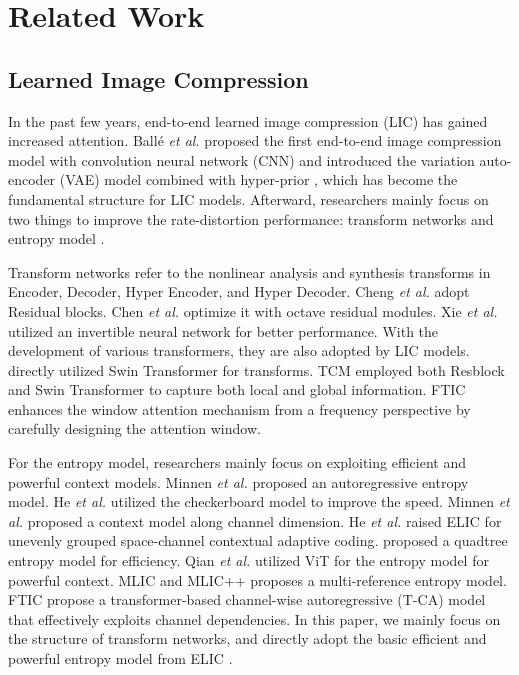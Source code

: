 \section{Related Work}
\label{sec:Related work}
\subsection{Learned Image Compression}





In the past few years, end-to-end learned image compression (LIC) has gained increased attention. Ball\'{e} \textit{et al.} \cite{balle2016end} proposed the first end-to-end image compression model with convolution neural network (CNN) and introduced the variation auto-encoder (VAE) model combined with hyper-prior \cite{balle2018variational}, which has become the fundamental structure for LIC models. Afterward, researchers mainly focus on two things to improve the rate-distortion performance: transform networks and entropy model \cite{zafari2023frequency, mentzer2022vct, ma2019iwave, lu2022transformer, liu2020unified, gao2021neural, fu2023asymmetric, begaint2020compressai, han2024causal}.

Transform networks refer to the nonlinear analysis and synthesis transforms in Encoder, Decoder, Hyper Encoder, and Hyper Decoder. Cheng \textit{et al.} \cite{cheng2020learned} adopt Residual blocks. Chen \textit{et al.} \cite{chen2022two} optimize it with octave residual modules. Xie  \textit{et al.} \cite{xie2021enhanced} utilized an invertible neural network for better performance. With the development of various transformers, they are also adopted by LIC models.  \cite{zou2022devil, zhu2022transformer} directly utilized Swin Transformer for transforms. TCM  \cite{liu2023learned} employed both Resblock and Swin Transformer to capture both local and global information. FTIC  \cite{li2023frequency} enhances the window attention mechanism from a frequency perspective by carefully designing the attention window.

For the entropy model, researchers mainly focus on exploiting efficient and powerful context models.  Minnen \textit{et al.} \cite{minnen2018joint} proposed an autoregressive entropy model. He \textit{et al.}  \cite{he2021checkerboard} utilized the checkerboard model to improve the speed. Minnen  \textit{et al.} \cite{minnen2020channel} proposed a context model along channel dimension. He \textit{et al.} \cite{he2022elic} raised ELIC for unevenly grouped space-channel contextual adaptive coding.  \cite{li2022hybrid, li2023neural} proposed a quadtree entropy model for efficiency.
 Qian \textit{et al.} \cite{qian2022entroformer} utilized ViT for the entropy model for powerful context. MLIC and MLIC++  \cite{jiang2023mlic, jiang2023mlic++} proposes a multi-reference entropy model. FTIC  \cite{li2023frequency} propose a transformer-based channel-wise autoregressive (T-CA) model that effectively exploits channel dependencies. In this paper, we mainly focus on the structure of transform networks, and directly adopt the basic efficient and powerful entropy model from ELIC \cite{he2022elic}.

